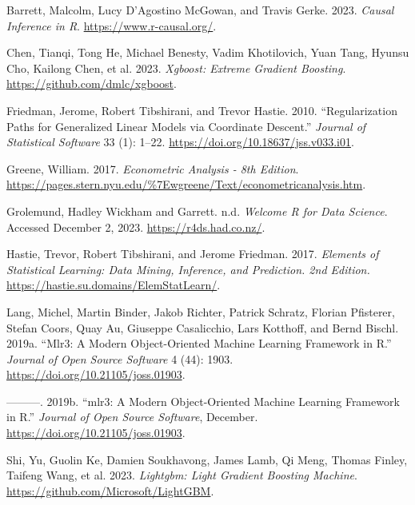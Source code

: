 \documentclass[
  letterpaper,
]{krantz}
\newlength{\cslhangindent}
\newlength{\cslentryspacingunit} %
\newenvironment{CSLReferences}[2] %
 {%
  \setlength{\parindent}{0pt}
  \ifodd #1
  \let\oldpar\par
  \def\par{\hangindent=\cslhangindent\oldpar}
  \fi
  \setlength{\parskip}{#2\cslentryspacingunit}
 }%
 {}
\begin{document}
\hypertarget{refs}{}
\begin{CSLReferences}{1}{0}
\leavevmode{}%
Barrett, Malcolm, Lucy D'Agostino McGowan, and Travis Gerke. 2023.
\emph{Causal {Inference} in {R}}. \url{https://www.r-causal.org/}.

\leavevmode{}%
Chen, Tianqi, Tong He, Michael Benesty, Vadim Khotilovich, Yuan Tang,
Hyunsu Cho, Kailong Chen, et al. 2023. \emph{Xgboost: Extreme Gradient
Boosting}. \url{https://github.com/dmlc/xgboost}.

\leavevmode{}%
Friedman, Jerome, Robert Tibshirani, and Trevor Hastie. 2010.
{``Regularization Paths for Generalized Linear Models via Coordinate
Descent.''} \emph{Journal of Statistical Software} 33 (1): 1--22.
\url{https://doi.org/10.18637/jss.v033.i01}.

\leavevmode{}%
Greene, William. 2017. \emph{Econometric {Analysis} - 8th {Edition}}.
\url{https://pages.stern.nyu.edu/%7Ewgreene/Text/econometricanalysis.htm}.

\leavevmode{}%
Grolemund, Hadley Wickham and Garrett. n.d. \emph{Welcome {\textbar} {R}
for {Data} {Science}}. Accessed December 2, 2023.
\url{https://r4ds.had.co.nz/}.

\leavevmode{}%
Hastie, Trevor, Robert Tibshirani, and Jerome Friedman. 2017.
\emph{Elements of {Statistical} {Learning}: Data Mining, Inference, and
Prediction. 2nd {Edition}.}
\url{https://hastie.su.domains/ElemStatLearn/}.

\leavevmode{}%
Lang, Michel, Martin Binder, Jakob Richter, Patrick Schratz, Florian
Pfisterer, Stefan Coors, Quay Au, Giuseppe Casalicchio, Lars Kotthoff,
and Bernd Bischl. 2019a. {``Mlr3: {A} Modern Object-Oriented Machine
Learning Framework in {R}.''} \emph{Journal of Open Source Software} 4
(44): 1903. \url{https://doi.org/10.21105/joss.01903}.

\leavevmode{}%
---------. 2019b. {``{mlr3}: A Modern Object-Oriented Machine Learning
Framework in {R}.''} \emph{Journal of Open Source Software}, December.
\url{https://doi.org/10.21105/joss.01903}.

\leavevmode{}%
Shi, Yu, Guolin Ke, Damien Soukhavong, James Lamb, Qi Meng, Thomas
Finley, Taifeng Wang, et al. 2023. \emph{Lightgbm: Light Gradient
Boosting Machine}. \url{https://github.com/Microsoft/LightGBM}.


\end{CSLReferences}
\end{document}
